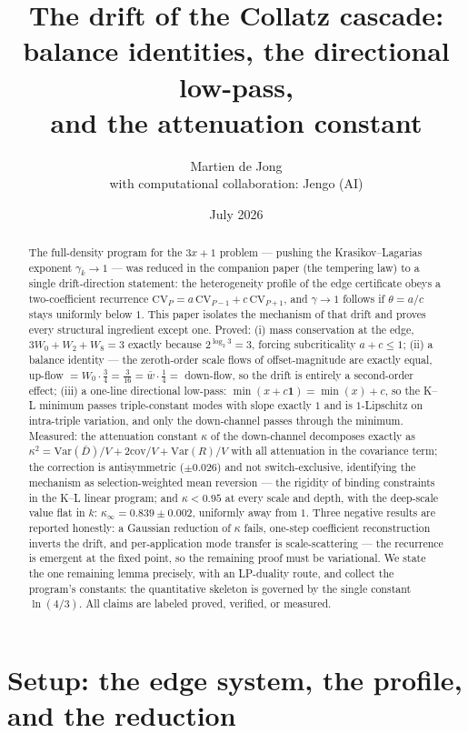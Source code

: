 \documentclass[11pt]{article}
\title{The drift of the Collatz cascade:\\
balance identities, the directional low-pass,\\
and the attenuation constant}
\author{Martien de Jong\\[3pt]
{\normalsize with computational collaboration: Jengo (AI)}}
\date{July 2026}
\theoremstyle{definition}
\theoremstyle{remark}
\newcommand{\CV}{\mathrm{CV}}
\newcommand{\Var}{\mathrm{Var}}
\newcommand{\cov}{\mathrm{cov}}
\newcommand{\gam}{\gamma}
\newcommand{\kap}{\kappa}
\begin{document}
\maketitle

\begin{abstract}
The full-density program for the $3x+1$ problem --- pushing the
Krasikov--Lagarias exponent $\gam_k \to 1$ --- was reduced in the companion
paper (the tempering law) to a single drift-direction statement: the
heterogeneity profile of the edge certificate obeys a two-coefficient
recurrence $\CV_P = a\,\CV_{P-1} + c\,\CV_{P+1}$, and $\gam \to 1$ follows
if $\theta = a/c$ stays uniformly below $1$. This paper isolates the
mechanism of that drift and proves every structural ingredient except one.
Proved: (i) mass conservation at the edge, $3W_0 + W_2 + W_8 = 3$ exactly
because $2^{\log_2 3} = 3$, forcing subcriticality $a + c \leq 1$;
(ii) a balance identity --- the zeroth-order scale flows of
offset-magnitude are exactly equal, up-flow $= W_0 \cdot \tfrac34 =
\tfrac{3}{16} = \bar w \cdot \tfrac14 =$ down-flow, so the drift is
entirely a second-order effect; (iii) a one-line directional low-pass:
$\min(x + c\mathbf{1}) = \min(x) + c$, so the K--L minimum passes
triple-constant modes with slope exactly $1$ and is $1$-Lipschitz on
intra-triple variation, and only the down-channel passes through the
minimum. Measured: the attenuation constant $\kap$ of the down-channel
decomposes exactly as $\kap^2 = \Var(\bar D)/V + 2\cov/V + \Var(R)/V$ with
all attenuation in the covariance term; the correction is antisymmetric
($\pm 0.026$) and not switch-exclusive, identifying the mechanism as
selection-weighted mean reversion --- the rigidity of binding constraints
in the K--L linear program; and $\kap < 0.95$ at every scale and depth,
with the deep-scale value flat in $k$: $\kap_\infty = 0.839 \pm 0.002$,
uniformly away from $1$. Three negative results are reported honestly:
a Gaussian reduction of $\kap$ fails, one-step coefficient reconstruction
inverts the drift, and per-application mode transfer is scale-scattering
--- the recurrence is emergent at the fixed point, so the remaining proof
must be variational. We state the one remaining lemma precisely, with an
LP-duality route, and collect the program's constants: the quantitative
skeleton is governed by the single constant $\ln(4/3)$.
All claims are labeled proved, verified, or measured.
\end{abstract}

\section{Setup: the edge system, the profile, and the reduction}
\label{sec:setup}
\end{document}
